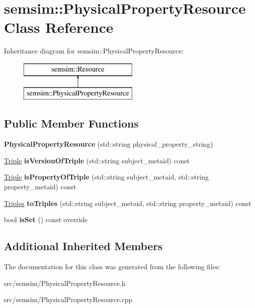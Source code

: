 \hypertarget{classsemsim_1_1PhysicalPropertyResource}{}\section{semsim\+:\+:Physical\+Property\+Resource Class Reference}
\label{classsemsim_1_1PhysicalPropertyResource}
Inheritance diagram for semsim\+:\+:Physical\+Property\+Resource\+:\begin{figure}[H]
\begin{center}
\leavevmode
\includegraphics[height=2.000000cm]{classsemsim_1_1PhysicalPropertyResource}
\end{center}
\end{figure}
\subsection*{Public Member Functions}
\begin{DoxyCompactItemize}
\item 
\mbox{\label{classsemsim_1_1PhysicalPropertyResource_aa1fd98e8e7f451f7e399f4eed1b66521}} 
{\bfseries Physical\+Property\+Resource} (std\+::string physical\+\_\+property\+\_\+string)
\item 
\mbox{\label{classsemsim_1_1PhysicalPropertyResource_a2368cabb4268b7869dc550caca498d36}} 
\hyperlink{classsemsim_1_1Triple}{Triple} {\bfseries is\+Version\+Of\+Triple} (std\+::string subject\+\_\+metaid) const
\item 
\mbox{\label{classsemsim_1_1PhysicalPropertyResource_a9b8353de4178fc6d10ef64fdf8a0d0f7}} 
\hyperlink{classsemsim_1_1Triple}{Triple} {\bfseries is\+Property\+Of\+Triple} (std\+::string subject\+\_\+metaid, std\+::string property\+\_\+metaid) const
\item 
\mbox{\label{classsemsim_1_1PhysicalPropertyResource_a39c3c740dfcddcfc57c32e46894db4cc}} 
\hyperlink{classsemsim_1_1Triples}{Triples} {\bfseries to\+Triples} (std\+::string subject\+\_\+metaid, std\+::string property\+\_\+metaid) const
\item 
\mbox{\label{classsemsim_1_1PhysicalPropertyResource_afea7c0c29e019e7f3756d8a646c9a8b6}} 
bool {\bfseries is\+Set} () const override
\end{DoxyCompactItemize}
\subsection*{Additional Inherited Members}


The documentation for this class was generated from the following files\+:\begin{DoxyCompactItemize}
\item 
src/semsim/Physical\+Property\+Resource.\+h\item 
src/semsim/Physical\+Property\+Resource.\+cpp\end{DoxyCompactItemize}
